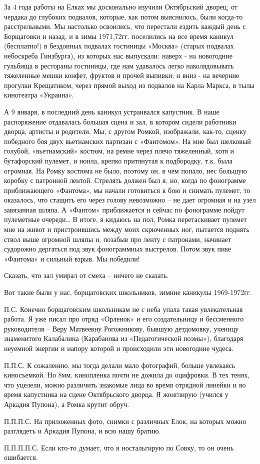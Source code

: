 За 4 года работы на Елках мы досконально изучили Октябрьский дворец, от чердака
до глубоких подвалов, которые, как потом выяснилось, были когда-то
расстрельными. Мы настолько освоились, что перестали ездить каждый день с
Борщаговки и назад, и в зимы 1971,72гг. поселились на все время каникул
(бесплатно!) в бездонных подвалах гостиницы «Москва» (старых подвалах
небоскреба Гинзбурга), из которых нас выпускали: наверх - на новогодние
гульбища в рестораны гостиницы, где нам удавалось легко наколядовывать
тяжеленные мешки конфет, фруктов и прочей выпивки; и вниз - на вечерние
прогулки Крещатиком, через прямой выход из подвалов на Карла Маркса, в тылы
кинотеатра «Украина». 

А 9 января, в последний день каникул устраивался капустник. В наше распоряжение
отдавалась большая сцена и зал, в котором сидели работники дворца, артисты и
родители. Мы, с другом Ромкой, изображали, как-то, сценку победного боя двух
вьетнамских партизан с «Фантомом». На мне был шелковый голубой,  «вьетнамский»
костюм, на ремне через плечо тяжеленный, хотя и бутафорский пулемет, и нонла,
крепко притянутая к подбородку, т.к. была огромная. На Ромку костюма не было,
поэтому он, в чем попало, нес большую коробку с патронной лентой. Стрелять
должен был я, но, когда по фонограмме приближающего «Фантома», мы начали
готовиться к бою и снимать пулемет, то оказалось, что стащить его через голову
невозможно – не дает огромная и на узел завязанная шляпа. А «Фантом»
приближается и сейчас по фонограмме пойдут пулеметные очереди…  В итоге, я
кидаюсь на пол, Ромка перетаскивает пулемет мне на живот и пристроившись между
моих скрюченных ног, пытается поднять ствол выше огромной шляпы и, позабыв про
ленту с патронами, начинает судорожно дергаться под звук фонограммных
выстрелов. Потом звук пике «Фантома» и сильный взрыв. Мы победили! 

Сказать, что зал умирал от смеха – ничего не сказать.

Вот такие были у нас, борщаговских школьников, зимние каникулы 1969-1972гг. 

П.С. Конечно борщаговским школьникам не с неба упала такая увлекательная
работа. Я уже писал про отряд «Орленок» и его создательницу и бессменного
руководителя – Веру Матвеевну Рогожникову, бывшую детдомовку, ученицу
знаменитого Калабалина (Карабанова из «Педагогической поэмы»), благодаря
неуемной энергии и напору которой и происходили эти новогодние чудеса.

П.П.С. К сожалению, мы тогда делали мало фотографий, больше увлекаясь
киносъемкой. Но 8мм. кинопленка почти не дожила до оцифровки. В тех тенях, что
уцелели, можно различить знакомые лица во время отрядной линейки и во время
капустника на сцене Октябрьского дворца. Я жонглирую (учился у Аркадия Пупона),
а Ромка крутит обруч.

П.П.П.С. На приложенных фото, снимки с различных Елок, на которых можно
разглядеть и Аркадия Пупона, и всю нашу братию.

П.П.П.П.С. Если кто-то думает, что я ностальгирую по Совку, то он очень
ошибается.

